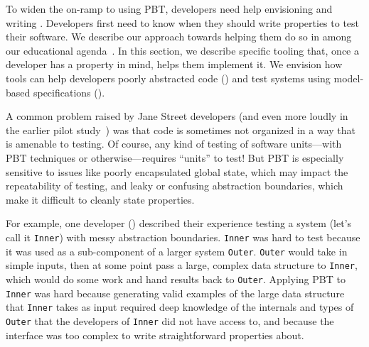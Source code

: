 %
To widen the on-ramp to using PBT, developers need help envisioning and
writing . Developers first need to know when they
should write properties to test their software. We describe our approach towards
helping them do so in among our educational agenda~. In
this section, we describe specific tooling that, once a developer has a property
in mind, helps them implement it. We envision how tools can help developers
poorly abstracted code () and test systems using
model-based specifications ().

A common problem
raised by Jane Street
developers (and even more loudly in the earlier pilot
study~\cite{ref:goldstein2022some}) was that code is sometimes not
organized in a way that is amenable to testing.  Of course, any kind of
testing of software units---with PBT techniques or otherwise---requires
``units'' to test!  But PBT is
especially sensitive to issues like poorly encapsulated global state, which may
impact the repeatability of testing, and leaky or confusing
abstraction boundaries, which make it difficult to cleanly state
properties.

For example, one developer () described their experience testing a
system (let's call it \lstinline{Inner}) with messy abstraction
boundaries. \lstinline{Inner} was hard to test because it was
used as a sub-component of a larger system \lstinline{Outer}.
\lstinline{Outer} would take in simple inputs, then at some point pass a
large, complex data structure to \lstinline{Inner}, which would do some work and
hand results back to \lstinline{Outer}. Applying PBT to
\lstinline{Inner} was
hard because generating valid examples of the large data structure that
\lstinline{Inner} takes as input required deep knowledge of the internals and
types of \lstinline{Outer} that the developers of \lstinline{Inner} did not have
access to, and because the interface was too complex to write straightforward
properties about.

